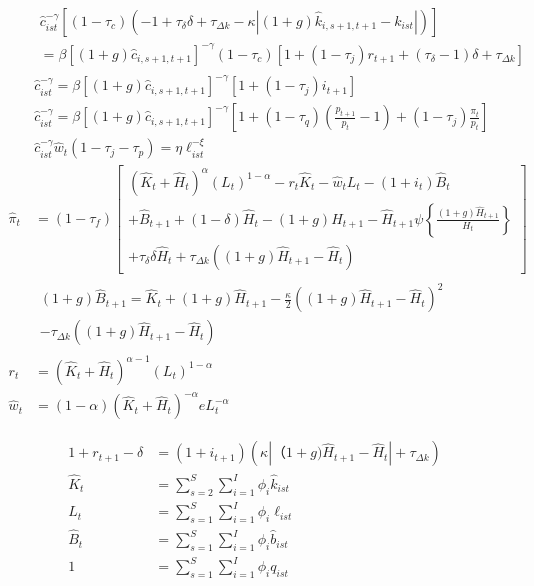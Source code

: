 \documentclass[letterpaper,12pt]{article}
\theoremstyle{definition}
\numberwithin{equation}{section}
\begin{document}
\begin{spacing}{1.5}
\begin{align}
      &\begin{matrix} \hat c_{ist}^{-\gamma}\left[(1-\tau_c)\left(-1+\tau_\delta \delta + \tau_{\Delta k} - \kappa \left|(1+g)\hat k_{i,s+1,t+1} - k_{ist} \right|\right)\right] \\
      = \beta [(1+g) \hat c_{i,s+1,t+1}]^{-\gamma}(1-\tau_c)\left[ 1 + (1-\tau_j)r_{t+1} + (\tau_\delta -1)\delta + \tau_{\Delta k} \right] 
      \end{matrix}\\
      & \hat c_{ist}^{-\gamma} = \beta [(1+g)\hat c_{i,s+1,t+1}]^{-\gamma} \left[ 1+(1-\tau_j)i_{t+1} \right] \\
      & \hat c_{ist}^{-\gamma} = \beta [(1+g)\hat c_{i,s+1,t+1}]^{-\gamma}\left[ 1 + (1 - \tau_q)(\tfrac{p_{t+1}}{p_t}-1) + (1-\tau_j)\tfrac{\pi_t}{p_t} \right] \\
      & \hat c_{ist}^{-\gamma} \hat w_t(1-\tau_j - \tau_p) = \eta \ell_{ist}^{-\xi} \\
      \hat \pi_t & = (1-\tau_f)\begin{bmatrix} (\hat K_t+\hat H_t)^\alpha(L_t)^{1-\alpha} - r_t \hat K_t - \hat w_t L_t - (1+i_t) \hat B_t \\
                                + \hat B_{t+1} + (1-\delta) \hat H_t - (1+g)\hat H_{t+1} - \hat H_{t+1}\psi\left\{\tfrac{(1+g)\hat H_{t+1}}{H_{t}} \right\} \\
                                + \tau_\delta \delta \hat H_t + \tau_{\Delta k} \left((1+g)\hat H_{t+1} - \hat H_t\right)\end{bmatrix} \\
      &\begin{matrix} (1+g) \hat B_{t+1} = \hat K_t + (1+g)\hat H_{t+1} - \tfrac{\kappa}{2}\left((1+g)\hat H_{t+1}-\hat H_t\right)^2 \\ - \tau_{\Delta k} \left((1+g)\hat H_{t+1} - \hat H_t\right) \end{matrix} \\
      r_t & = (\hat K_t+\hat H_t)^{\alpha-1}(L_t)^{1-\alpha} \\
      \hat w_t & = (1-\alpha) (\hat K_t+\hat H_t)^{-\alpha}eL_t^{-\alpha}
      \end{align}

      \begin{align}
      1 + r_{t+1} - \delta & = (1+i_{t+1}) \left( \kappa \left|（1+g)\hat H_{t+1} - \hat H_{t}\right| + \tau_{\Delta k} \right) \\
      \hat K_t & = \sum_{s=2}^S \sum_{i=1}^I \phi_i \hat k_{ist} \\
      L_t & = \sum_{s=1}^S \sum_{i=1}^I \phi_i \ell_{ist} \\
      \hat B_t & = \sum_{s=1}^S \sum_{i=1}^I \phi_i \hat b_{ist} \\
      1 & = \sum_{s=1}^S \sum_{i=1}^I \phi_i q_{ist} 
      \end{align}
  \newpage


\end{spacing}
\end{document}
